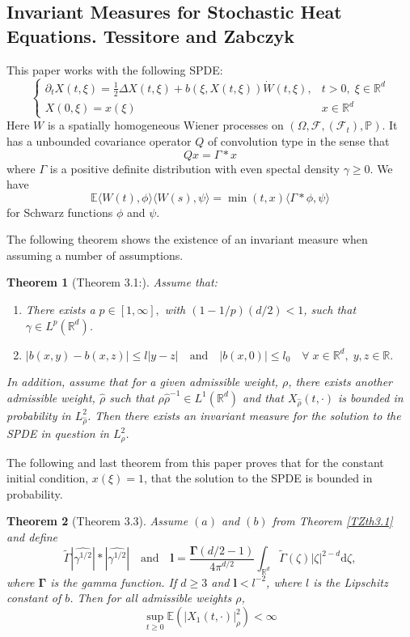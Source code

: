 \documentclass[a4paper,11pt]{article}%
\numberwithin{equation}{section}
\theoremstyle{plain}
\newtheorem{theorem}{Theorem}[section]
\theoremstyle{definition}
\newcommand{\R}{\mathbb{R}}
\newcommand{\ud}{\ensuremath{ \mathrm{d} }}
\begin{document}
	\subsection{Invariant Measures for Stochastic Heat Equations. Tessitore and Zabczyk \cite{TessitoreZabczyk98M}}
This paper works with the following SPDE:
	\[
		\begin{cases}
		\partial_t X(t,\xi) = \frac{1}{2} \Delta X(t,\xi) + b(\xi,X(t,\xi)) \dot{W}(t,\xi), & t>0, \; \xi \in \R^d
		\\ X(0,\xi) = x(\xi) & x \in \R^d
		\end{cases}
	\]
Here $W$ is a spatially homogeneous Wiener processes on $(\Omega,\mathscr{F},(\mathscr{F}_t), \mathbb{P})$. It has a unbounded covariance operator $Q$ of convolution type in the sense that
	\[
		Qx = \Gamma*x
	\]
where $\Gamma$ is a positive definite distribution with even spectal density $\gamma \ge 0$. We have
	\[
		\mathbb{E}\langle W(t),\phi \rangle\langle W(s) , \psi \rangle = \min(t,x) \langle \Gamma * \phi , \psi \rangle
	\]
for Schwarz functions $\phi$ and $\psi$.

The following theorem shows the existence of an invariant measure when assuming a number of assumptions.

	\begin{theorem}[Theorem 3.1:]\label{T:TZth3.1}
Assume that:
		\begin{enumerate}
			\item There exists a $p\in [1,\infty],$ with $(1-1/p)(d/2) < 1$, such that $\gamma \in L^p(\R^d)$.
			\item $|b(x,y)-b(x,z)| \le l|y-z| \quad \text{and} \quad |b(x,0)| \le l_0 \quad \forall \; x \in \R^d, \; y,z \in \R.$
		\end{enumerate}
In addition, assume that for a given admissible weight, $\rho$, there exists another admissible weight, $\hat{\rho}$ such that $\rho \hat{\rho}^{-1} \in L^1(\R^d)$ and that $X_{\hat{\rho}}(t,\cdot)$ is bounded in probability in $L^2_{\hat{\rho}}$. Then there exists an invariant measure for the solution to the SPDE in question in $L^2_{\rho}$.
	\end{theorem}

The following and last theorem from this paper proves that for the constant initial condition, $x(\xi)=1$, that the solution to the SPDE is bounded in probability.

	\begin{theorem}[Theorem 3.3]\label{T:TXth3.3}
Assume $(a)$ and $(b)$ from Theorem \ref{TZth3.1} and define
		\[
			\tilde{\Gamma}|\widehat{\gamma^{1/2}} | * |\widehat{\gamma^{1/2}}| \quad \text{and} \quad \textbf{l}= \frac{\mathbf{\Gamma}(d/2-1) } {4\pi^{d/2}} \int_{\R^d} \tilde{\Gamma}(\zeta) |\zeta|^{2-d} \ud \zeta,
		\]
where $\mathbf{\Gamma}$ is the gamma function. If $d \ge 3$ and $\textbf{l} < l^{-2}$, where $l$ is the Lipschitz constant of $b$. Then for all admissible weights $\rho$,
		\[
			\sup_{t\ge0} \mathbb{E}(|X_1(t,\cdot)|_{\rho}^2) < \infty
		\]
	\end{theorem}
\end{document}
